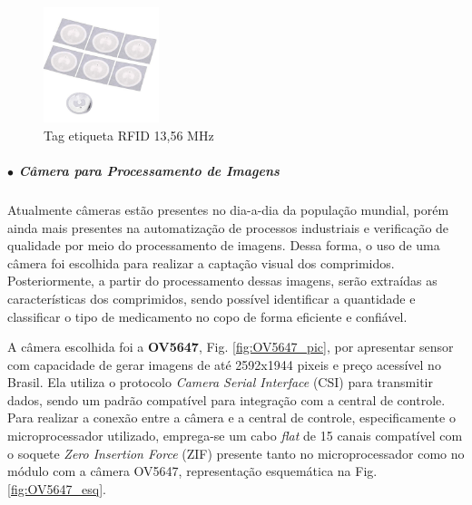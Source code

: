    \begin{figure}[H]
        \centering
        \includegraphics[width=0.3\textwidth]{figuras/eletronica/fotos_componentes/etiqueta_rfid.jpg}
        \caption{Tag etiqueta RFID 13,56 MHz}
        \label{fig:etiqueta_rfid}
     \end{figure}
   
    \subparagraph*{$\bullet$ Câmera para Processamento de Imagens} \hfill
    
    Atualmente câmeras estão presentes no dia-a-dia da população mundial, porém ainda mais presentes na automatização de processos industriais e verificação de qualidade por meio do processamento de imagens. Dessa forma, o uso de uma câmera foi escolhida para realizar a captação visual dos comprimidos. Posteriormente, a partir do  processamento dessas imagens, serão extraídas as características dos comprimidos, sendo possível identificar a quantidade e classificar o tipo de medicamento no copo de forma eficiente e confiável.
    
    A câmera escolhida foi a \textbf{OV5647}, Fig. \ref{fig:OV5647_pic}, por apresentar sensor com capacidade de gerar imagens de até 2592x1944 pixeis e preço acessível no Brasil. Ela utiliza o protocolo \textit{Camera Serial Interface} (CSI) para transmitir dados, sendo um padrão compatível para integração com a central de controle. Para realizar a conexão entre a câmera e a central de controle, especificamente o microprocessador utilizado, emprega-se um cabo \textit{flat} de 15 canais compatível com o soquete \textit{Zero Insertion Force} (ZIF) presente tanto no microprocessador como no módulo com a câmera OV5647, representação esquemática na Fig. \ref{fig:OV5647_esq}.
    
